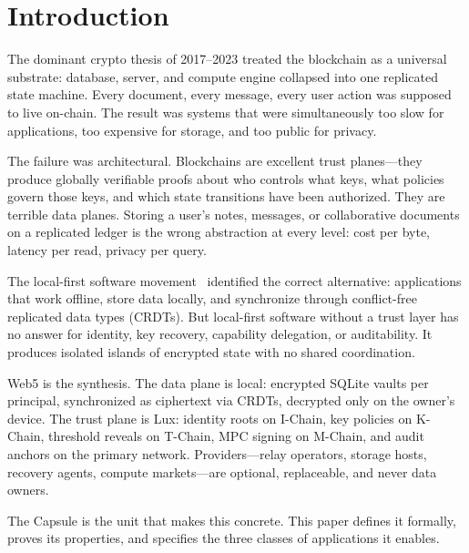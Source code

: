 \section{Introduction}
\label{sec:intro}

The dominant crypto thesis of 2017--2023 treated the blockchain as a universal
substrate: database, server, and compute engine collapsed into one replicated
state machine. Every document, every message, every user action was supposed to
live on-chain. The result was systems that were simultaneously too slow for
applications, too expensive for storage, and too public for privacy.

The failure was architectural. Blockchains are excellent trust planes---they
produce globally verifiable proofs about who controls what keys, what policies
govern those keys, and which state transitions have been authorized. They are
terrible data planes. Storing a user's notes, messages, or collaborative documents
on a replicated ledger is the wrong abstraction at every level: cost per byte,
latency per read, privacy per query.

The local-first software movement~\cite{kleppmann2019} identified the correct
alternative: applications that work offline, store data locally, and synchronize
through conflict-free replicated data types (CRDTs). But local-first software
without a trust layer has no answer for identity, key recovery, capability
delegation, or auditability. It produces isolated islands of encrypted state
with no shared coordination.

Web5 is the synthesis. The data plane is local: encrypted SQLite vaults per
principal, synchronized as ciphertext via CRDTs, decrypted only on the owner's
device. The trust plane is Lux: identity roots on I-Chain, key policies on
K-Chain, threshold reveals on T-Chain, MPC signing on M-Chain, and audit anchors
on the primary network. Providers---relay operators, storage hosts, recovery
agents, compute markets---are optional, replaceable, and never data owners.

The Capsule is the unit that makes this concrete. This paper defines it formally,
proves its properties, and specifies the three classes of applications it enables.

